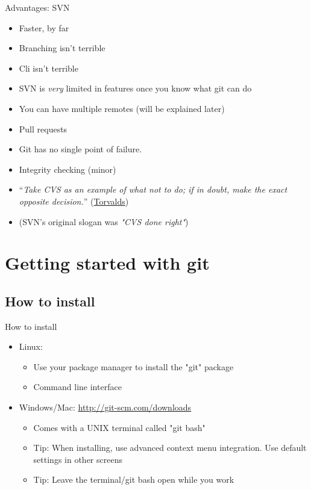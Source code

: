 \documentclass[10pt,a4paper]{beamer}
\begin{document}
\begin{frame}{Advantages: SVN}
\begin{itemize}
\item Faster, by far
\item Branching isn't terrible
\item Cli isn't terrible
\item SVN is \textit{very} limited in features once you know what git can do
\item You can have multiple remotes (will be explained later)
\item Pull requests
\item Git has no single point of failure.
\item Integrity checking (minor)
\item ``\textit{Take CVS as an example of what not to do; if in doubt, make the exact opposite decision.}'' (\href{http://www.youtube.com/watch?v=4XpnKHJAok8\&t=2m30s}{\color{blue}Torvalds})
\item (SVN's original slogan was \textit{"CVS done right"})

\end{itemize}
\end{frame}


\section{Getting started with git}


\subsection{How to install}
\begin{frame}{How to install}
\begin{itemize}
\item Linux:
\begin{itemize}
\item Use your package manager to install the "git" package
\item Command line interface 
\end{itemize}
\item Windows/Mac: \href{http://git-scm.com/downloads}{\color{blue}http://git-scm.com/downloads}
\begin{itemize}
\item Comes with a UNIX terminal called "git bash"
\item Tip: When installing, use advanced context menu integration. Use default settings in other screens
\item Tip: Leave the terminal/git bash open while you work
\end{itemize}
\end{itemize}
\end{frame}
\end{document}
